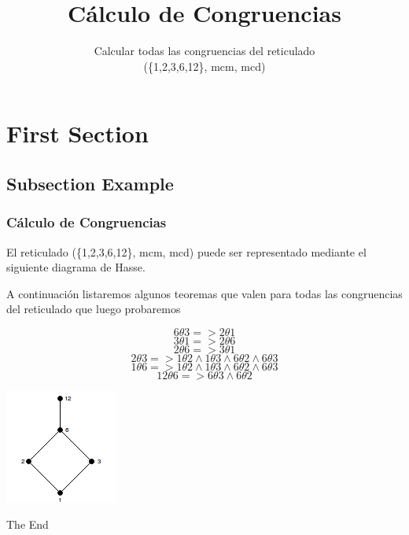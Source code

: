 \documentclass{beamer}
\title[Short title]{C\'alculo de Congruencias} %
\author{Calcular todas las congruencias del reticulado\\ (\{1,2,3,6,12\}, mcm, mcd)}
\begin{document}
\begin{frame}
\titlepage %
\end{frame}



\section{First Section}

\subsection{Subsection Example}

\begin{frame}
\frametitle{C\'alculo de Congruencias}
El reticulado (\{1,2,3,6,12\}, mcm, mcd) puede ser representado mediante el siguiente diagrama de Hasse.\\

\begin{center}
\end{center}
\end{frame}

\begin{frame}
A continuaci\'on listaremos algunos teoremas que valen para todas las congruencias del reticulado que luego probaremos
\begin{theorem}

\[  6 \theta 3 =>  2 \theta 1 \]
\[  3 \theta 1 =>  2 \theta 6 \]
\[  2 \theta 6 =>  3 \theta 1 \]
\[  2 \theta 3 =>  1 \theta 2 \land 1\theta3 \land 6\theta2 \land 6\theta3 \]
\[  1 \theta 6 =>  1 \theta 2 \land 1\theta3 \land 6\theta2 \land 6\theta3 \]
\[  12 \theta 6 =>  6 \theta 3 \land  6\theta2 \]

\end{theorem}
\end{frame}

\begin{frame}
\includegraphics{ret_diagram}
\end{frame}

\begin{frame}
\Huge{\centerline{The End}}
\end{frame}

\end{document}
